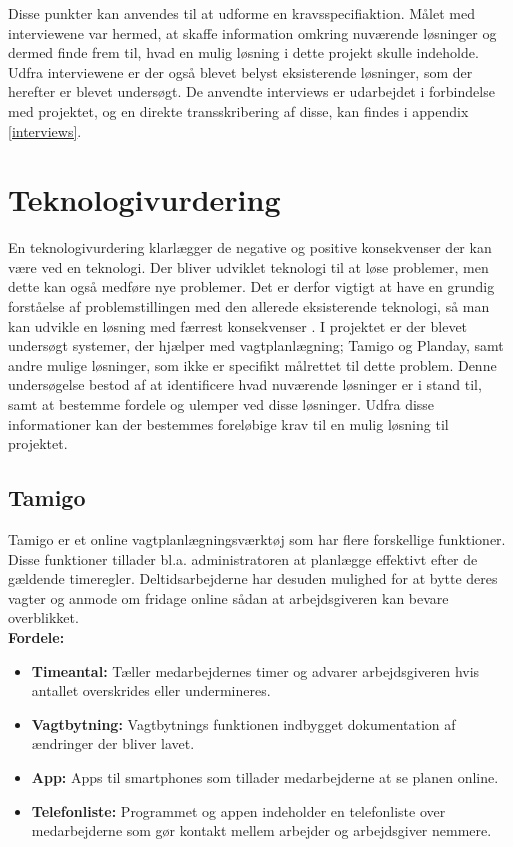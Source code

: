 Disse punkter kan anvendes til at udforme en kravsspecifiaktion. Målet med interviewene var hermed, at skaffe information omkring nuværende løsninger og dermed finde frem til, hvad en mulig løsning i dette projekt skulle indeholde. Udfra interviewene er der også blevet belyst eksisterende løsninger, som der herefter er blevet undersøgt.
De anvendte interviews er udarbejdet i forbindelse med projektet, og en direkte transskribering af disse, kan findes i appendix \ref{interviews}.

\section{Teknologivurdering}

En teknologivurdering klarlægger de negative og positive konsekvenser der kan være ved en teknologi. Der bliver udviklet teknologi til at løse problemer, men dette kan også medføre nye problemer. Det er derfor vigtigt at have en grundig forståelse af problemstillingen med den allerede eksisterende teknologi, så man kan udvikle en løsning med færrest konsekvenser \citep{ProTek}.
I projektet er der blevet undersøgt systemer, der hjælper med vagtplanlægning; Tamigo og Planday, samt andre mulige løsninger, som ikke er specifikt målrettet til dette problem. Denne undersøgelse bestod af at identificere hvad nuværende løsninger er i stand til, samt at bestemme fordele og ulemper ved disse løsninger. Udfra disse informationer kan der bestemmes foreløbige krav til en mulig løsning til projektet.

\subsection{Tamigo}
Tamigo er et online vagtplanlægningsværktøj som har flere forskellige funktioner. Disse funktioner tillader bl.a. administratoren at planlægge effektivt efter de gældende timeregler. Deltidsarbejderne har desuden mulighed for at bytte deres vagter og anmode om fridage online sådan at arbejdsgiveren kan bevare overblikket.\\

\textbf{Fordele: }
\begin{itemize}
\item {\textbf{Timeantal:} Tæller medarbejdernes timer og advarer arbejdsgiveren hvis antallet overskrides eller undermineres.}
\item {\textbf{Vagtbytning:} Vagtbytnings funktionen indbygget dokumentation af ændringer der bliver lavet.}
\item {\textbf{App:} Apps til smartphones som tillader medarbejderne at se planen online.}
\item {\textbf{Telefonliste:} Programmet og appen indeholder en telefonliste over medarbejderne som gør kontakt mellem arbejder og arbejdsgiver nemmere.}\\
\end{itemize}


